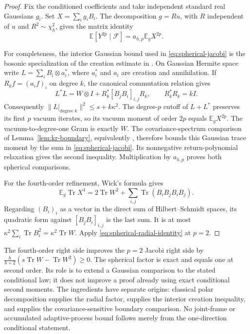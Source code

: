 \documentclass[11pt,a4paper]{article}
\theoremstyle{definition}\newtheorem{definition}[theorem]{Definition}
\theoremstyle{remark}\newtheorem{remark}[theorem]{Remark}
\numberwithin{equation}{section}
\begin{document}
\begin{proof}
Fix the conditioned coefficients and take independent standard real
Gaussians $g_i$.  Set $X=\sum_i g_iB_i$.  The decomposition
$g=Ru$, with $R$ independent of $u$ and $R^2\sim\chi_h^2$, gives the
matrix identity
\begin{equation}\label{eq:spherical-radial-identity}
 \mathbb E[Y^{2p}\mid\mathcal F]=a_{h,p}\mathbb E_gX^{2p}.
\end{equation}

For completeness, the interior Gaussian bound used in
\eqref{eq:spherical-jacobi} is the bosonic specialization of the creation
estimate in \cite[Proposition 4.1]{Bandeira}.  On Gaussian Hermite space
write $L=\sum_i B_i\otimes a_i^*$, where $a_i^*$ and $a_i$ are creation
and annihilation.  If $R_k f=(a_i f)_i$ on degree $k$, the canonical
commutation relation gives
\[
 L^*L=W\otimes I+R_k^*[B_jB_i]_{i,j}R_k,
 \qquad R_k^*R_k=kI.
\]
Consequently $\|L|_{\text{degree }k}\|^2\le s+k\kappa^2$.
The degree-$p$ cutoff of $L+L^*$ preserves its first $p$ vacuum iterates,
so its vacuum moment of order $2p$ equals $\mathbb E_gX^{2p}$.
The vacuum-to-degree-one Gram is exactly $W$.
The covariance-spectrum comparison of Lemma~\ref{lem:kr-boundary},
equivalently \cite[Corollary 4.4]{GradedSource}, therefore bounds this
Gaussian trace moment by the sum in \eqref{eq:spherical-jacobi}.
Its nonnegative return-polynomial relaxation gives the second inequality.
Multiplication by $a_{h,p}$ proves both spherical comparisons.

For the fourth-order refinement, Wick's formula gives
\[
 \mathbb E_g\operatorname{Tr}X^4
 =2\operatorname{Tr}W^2
       +\sum_{i,j}\operatorname{Tr}(B_iB_jB_iB_j).
\]
Regarding $(B_i)_i$ as a vector in the direct sum of Hilbert--Schmidt
spaces, its quadratic form against $[B_jB_i]_{i,j}$ is the last sum.
It is at most $\kappa^2\sum_i\operatorname{Tr}B_i^2
=\kappa^2\operatorname{Tr}W$.  Apply
\eqref{eq:spherical-radial-identity} at $p=2$.
\end{proof}

The fourth-order right side improves the $p=2$ Jacobi right side by
$\frac{h}{h+2}(s\operatorname{Tr}W-\operatorname{Tr}W^2)\ge0$.
The spherical factor is exact and equals one at second order.
Its role is to extend a Gaussian comparison to the stated conditional
law; it does not improve a proof already using exact conditional second
moments.  The ingredients have separate origins: classical polar
decomposition supplies the radial factor, \cite{Bandeira} supplies the
interior creation inequality, and \cite{GradedSource} supplies the
covariance-sensitive boundary comparison.  No joint-frame or accumulated
adaptive-process bound follows merely from the one-direction conditional
statement.
\end{document}
